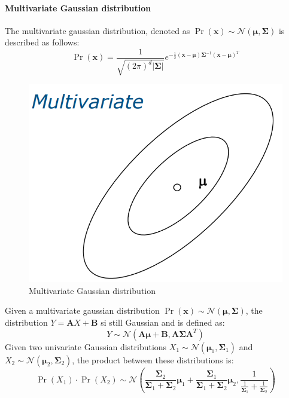 \paragraph*{Multivariate Gaussian distribution}
The multivariate gaussian distribution, denoted as $\Pr(\mathbf{x})\sim \mathcal{N}(\boldsymbol{\mu},\mathbf{\Sigma})$ is described as follows: 
\[\Pr(\mathbf{x})=\dfrac{1}{\sqrt{(2\pi)^d\left\lvert \mathbf{\Sigma} \right\rvert }}e^{-\frac{1}{2}(\mathbf{x}-\boldsymbol{\mu})\mathbf{\Sigma}^{-1}(\mathbf{x}-\boldsymbol{\mu})^T}\]
\begin{figure}[H]
    \centering
    \includegraphics[width=0.6\linewidth]{images/mgd.png}
    \caption{Multivariate Gaussian distribution}
\end{figure}
Given a multivariate gaussian distribution $\Pr(\mathbf{x})\sim \mathcal{N}(\boldsymbol{\mu},\mathbf{\Sigma})$, the distribution $Y=\mathbf{A}X+\mathbf{B}$ si still Gaussian and is defined as: 
\[Y\sim \mathcal{N}(\mathbf{A\mu}+\mathbf{B},\mathbf{A\Sigma A}^T)\]
Given two univariate Gaussian distributions $X_1\sim\mathcal{N}(\boldsymbol{\mu}_1,\mathbf{\Sigma}_1)$ and $X_2\sim\mathcal{N}(\boldsymbol{\mu}_2,\mathbf{\Sigma}_2)$, the product between these distributions is: 
\[\Pr(X_1)\cdot\Pr(X_2)\sim\mathcal{N}\left(\dfrac{\mathbf{\Sigma}_2}{\mathbf{\Sigma}_1+\mathbf{\Sigma}_2}\boldsymbol{\mu}_1+\dfrac{\mathbf{\Sigma}_1}{\mathbf{\Sigma}_1+\mathbf{\Sigma}_2}\boldsymbol{\mu}_2,\dfrac{1}{\frac{1}{\mathbf{\Sigma}_1}+\frac{1}{\mathbf{\Sigma}_2}}\right)\]

